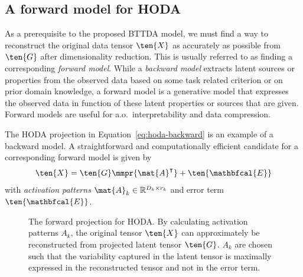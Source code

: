 \subsection{A forward model for HODA}
As a prerequisite to the proposed BTTDA model, we must find a
way to reconstruct the original data tensor $\ten{X}$ as accurately as possible
from $\ten{G}$ after dimensionality reduction.
This is usually referred to as finding a corresponding \emph{forward model}.
While a \emph{backward model} extracts latent sources or properties from the observed
data based on some task related criterion or on prior domain knowledge,
a forward model is a generative model that expresses the observed data in
function of these latent properties or sources that are given.
Forward models are useful for a.o.\ interpretability and data compression.

The HODA projection in Equation~\ref{eq:hoda-backward} is an example
of a backward model.
A straightforward and computationally efficient candidate for a corresponding
forward model is given by
\begin{equation}
	\ten{X} = \ten{G}\mmpr{\mat{A}^\intercal} + \ten{\mathbfcal{E}}
	\label{eq:HODA-forward}
\end{equation}
with \emph{activation patterns} $\mat{A}_k \in \mathbb{R}^{D_k\times r_k}$
and error term $\ten{\mathbfcal{E}}$.
\begin{figure}[t]
	\centering
	
	\caption{The forward projection for HODA. By calculating activation
		patterns $A_k$, the original tensor $\ten{X}$ can approximately be
		reconstructed from projected latent tensor $\ten{G}$. $A_k$ are chosen such
		that the variability captured in the latent tensor is maximally expressed in
		the reconstructed tensor and not in the error term.}
	\label{fig:HODA-forward}
\end{figure}

